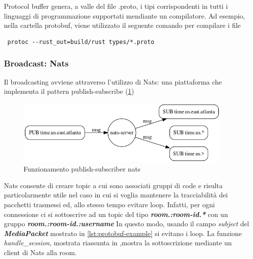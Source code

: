 \documentclass{article}
\begin{document}


Protocol buffer genera, a valle del file .proto, i tipi corrispondenti in tutti i linguaggi 
di programmazione supportati mendiante un compilatore. Ad esempio, nella cartella protobuf,
viene utilizzato il seguente comando per compilare i file 
\begin{verbatim}
 protoc --rust_out=build/rust types/*.proto 
\end{verbatim}

\subsubsection{Broadcast: Nats} 
Il broadcasting avviene attraverso l'utilizzo di Nats\cite{Nats}: una piattaforma che implementa il
pattern publish-subscribe (\cref{fig:nats})
\begin{figure}
  \begin{center}
    \includegraphics[width=0.95\textwidth]{figures/nats.png}
  \end{center}
  \caption{Funzionamento publish-subscriber nats}\label{fig:nats}
\end{figure}
Nats consente di creare topic a cui sono associati gruppi di code e risulta particolarmente
utile nel caso in cui si voglia mantenere la tracciabilità dei pacchetti trasmessi ed, allo
stesso tempo evitare loop. Infatti, per ogni connessione ci si sottoscrive ad un topic 
del tipo \textbf{\textit{room.:room-id.*}} con un gruppo \textbf{\textit{room.:room-id.:username}}
In questo modo, usando il campo \textit{subject} del \textbf{\textit{MediaPacket}} mostrato 
in \cref{lst:protobuf-example} si evitano i loop. La funzione \textit{handle\_session},
mostrata riassunta in ,mostra la sottoscrizione mediante un client di Nats alla room. 
\end{document}
